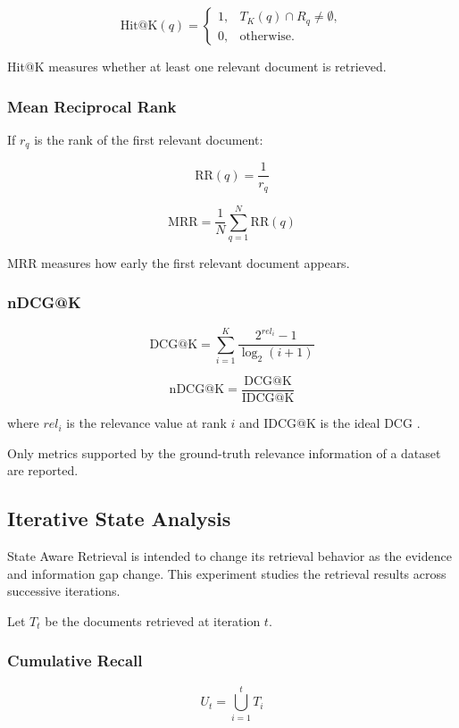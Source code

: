 \documentclass[12pt,a4paper]{report}
\begin{document}
\[
\mathrm{Hit@K}(q)
=
\begin{cases}
1, & T_K(q)\cap R_q\neq\emptyset,\\
0, & \text{otherwise}.
\end{cases}
\]

Hit@K measures whether at least one relevant document is retrieved.

\subsubsection{Mean Reciprocal Rank}

If $r_q$ is the rank of the first relevant document:

\[
\mathrm{RR}(q)=\frac{1}{r_q}
\]

\[
\mathrm{MRR}
=
\frac{1}{N}
\sum_{q=1}^{N}
\mathrm{RR}(q)
\]

MRR measures how early the first relevant document appears.

\subsubsection{nDCG@K}

\[
\mathrm{DCG@K}
=
\sum_{i=1}^{K}
\frac{2^{rel_i}-1}
{\log_2(i+1)}
\]

\[
\mathrm{nDCG@K}
=
\frac{\mathrm{DCG@K}}
{\mathrm{IDCG@K}}
\]

where $rel_i$ is the relevance value at rank $i$ and
$\mathrm{IDCG@K}$ is the ideal DCG \cite{jarvelin2002cumulated}.

Only metrics supported by the ground-truth relevance information of a
dataset are reported.

\subsection{Iterative State Analysis}

State Aware Retrieval is intended to change its retrieval behavior as
the evidence and information gap change. This experiment studies the
retrieval results across successive iterations.

Let $T_t$ be the documents retrieved at iteration $t$.

\subsubsection{Cumulative Recall}

\[
U_t
=
\bigcup_{i=1}^{t}T_i
\]
\end{document}
